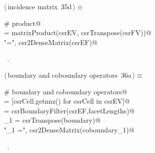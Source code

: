 \documentclass[11pt,oneside]{article}	%
\begin{document}
\begin{flushleft} \small \label{scrap63}
\protect{}$\langle\,$incidence matrix\nobreak\ {\footnotesize 35d}$\,\rangle\equiv$
\vspace{-1ex}
\begin{list}{}{} \item
\mbox{}\verb@# product@\\
\mbox{}\verb@csrEF = matrixProduct(csrEV, csrTranspose(csrFV))@\\
\mbox{}\verb@print "\nEF =\n", csr2DenseMatrix(csrEF)@\\
\mbox{}\verb@@{\NWsep}
\end{list}
\vspace{-1ex}
\footnotesize\addtolength{\baselineskip}{-1ex}
\begin{list}{}{\setlength{\itemsep}{-\parsep}\setlength{\itemindent}{-\leftmargin}}
\item \NWtxtMacroRefIn\ .
\end{list}
\end{flushleft}

\begin{flushleft} \small \label{scrap64}
\protect{}$\langle\,$boundary and coboundary operators\nobreak\ {\footnotesize 36a}$\,\rangle\equiv$
\vspace{-1ex}
\begin{list}{}{} \item
\mbox{}\verb@# boundary and coboundary operators@\\
\mbox{}\verb@facetLengths = [csrCell.getnnz() for csrCell in csrEV]@\\
\mbox{}\verb@boundary = csrBoundaryFilter(csrEF,facetLengths)@\\
\mbox{}\verb@coboundary_1 = csrTranspose(boundary)@\\
\mbox{}\verb@print "\ncoboundary_1 =\n", csr2DenseMatrix(coboundary_1)@\\
\mbox{}\verb@@{\NWsep}
\end{list}
\vspace{-1ex}
\footnotesize\addtolength{\baselineskip}{-1ex}
\begin{list}{}{\setlength{\itemsep}{-\parsep}\setlength{\itemindent}{-\leftmargin}}
\item \NWtxtMacroRefIn\ .
\end{list}
\end{flushleft}
\end{document}
